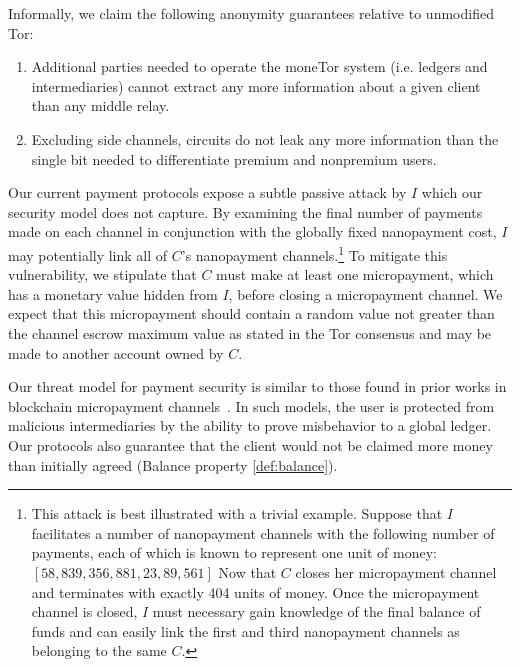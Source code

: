 Informally, we claim the following anonymity guarantees relative to unmodified Tor:

\begin{enumerate}
\item Additional parties needed to operate the moneTor system (i.e. ledgers and
  intermediaries) cannot extract any more information about a given client than
  any middle relay.
\item Excluding side channels, circuits do not leak any more information than
  the single bit needed to differentiate premium and nonpremium users.
\end{enumerate}

Our current payment protocols expose a subtle passive attack by $I$ which our security model does not capture. By examining
the final number of payments made on each channel in conjunction with the
globally fixed nanopayment cost, $I$ may potentially link all of $C$'s
nanopayment channels.\footnote{This attack is best illustrated with a trivial
  example. Suppose that $I$ facilitates a number of nanopayment channels with
  the following number of payments, each of which is known to represent one unit
  of money: $[58, 839, 356, 881, 23, 89, 561]$ Now that $C$ closes her
  micropayment channel and terminates with exactly 404 units of money. Once the
  micropayment channel is closed, $I$ must necessary gain knowledge of the final
  balance of funds and can easily link the first and third nanopayment channels
  as belonging to the same $C$.} To mitigate this vulnerability, we stipulate
that $C$ must make at least one micropayment, which has a monetary value hidden
from $I$, before closing a micropayment channel. We expect that this
micropayment should contain a random value not greater than the channel escrow
maximum value as stated in the Tor consensus and may be made to another account
owned by $C$.

Our threat model for payment security is similar to those found in prior works
in blockchain micropayment channels~\cite{poon2016bitcoin}. In such models, the
user is protected from malicious intermediaries by the ability to prove
misbehavior to a global ledger. Our protocols also guarantee that the client would not be claimed more money than initially agreed (Balance property \ref{def:balance}).
%

